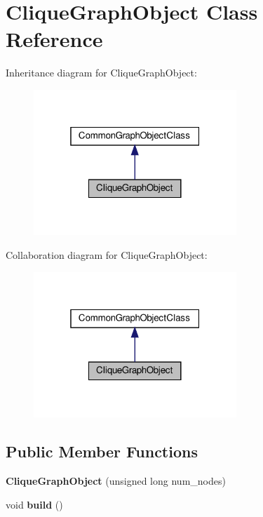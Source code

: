 \hypertarget{classCliqueGraphObject}{}\section{Clique\+Graph\+Object Class Reference}
\label{classCliqueGraphObject}


Inheritance diagram for Clique\+Graph\+Object\+:
\nopagebreak
\begin{figure}[H]
\begin{center}
\leavevmode
\includegraphics[width=217pt]{classCliqueGraphObject__inherit__graph}
\end{center}
\end{figure}


Collaboration diagram for Clique\+Graph\+Object\+:
\nopagebreak
\begin{figure}[H]
\begin{center}
\leavevmode
\includegraphics[width=217pt]{classCliqueGraphObject__coll__graph}
\end{center}
\end{figure}
\subsection*{Public Member Functions}
\begin{DoxyCompactItemize}
\item 
\mbox{\label{classCliqueGraphObject_a55132ef307105aacf09868e308d6d52f}} 
{\bfseries Clique\+Graph\+Object} (unsigned long num\+\_\+nodes)
\item 
\mbox{\label{classCliqueGraphObject_a415a29f1db0ccf20e75679bf2833d463}} 
void {\bfseries build} ()
\end{DoxyCompactItemize}
